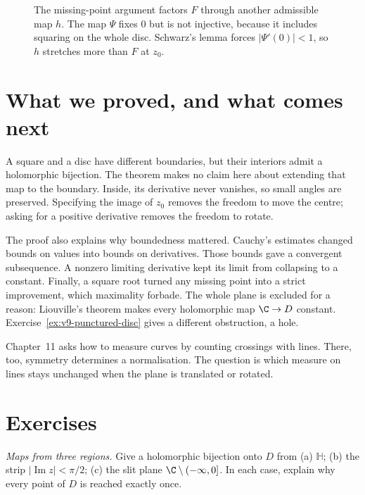 \begin{figure}[ht]
\centering
{}
\caption{The missing-point argument factors $F$ through another admissible map $h$. The map $\Psi$ fixes $0$ but is not injective, because it includes squaring on the whole disc. Schwarz's lemma forces $|\Psi'(0)|<1$, so $h$ stretches more than $F$ at $z_0$.}
\label{fig:v9-extremal-map}
\end{figure}

\section{What we proved, and what comes next}

A square and a disc have different boundaries, but their interiors admit a
holomorphic bijection. The theorem makes no claim here about extending that
map to the boundary. Inside, its derivative never vanishes, so small angles
are preserved. Specifying the image of $z_0$ removes the freedom to move the
centre; asking for a positive derivative removes the freedom to rotate.

The proof also explains why boundedness mattered. Cauchy's estimates changed
bounds on values into bounds on derivatives. Those bounds gave a convergent
subsequence. A nonzero limiting derivative kept its limit from collapsing to
a constant. Finally, a square root turned any missing point into a strict
improvement, which maximality forbade. The whole plane is excluded for a
reason: Liouville's theorem makes every holomorphic map $\C\to D$ constant.
Exercise~\ref{ex:v9-punctured-disc} gives a different obstruction, a hole.

Chapter~11 asks how to measure curves by counting crossings with lines.
There, too, symmetry determines a normalisation. The question is which
measure on lines stays unchanged when the plane is translated or rotated.

\section{Exercises}

\begin{exercise}[$\star$]\label{ex:riemannmaps}
\emph{Maps from three regions.} Give a holomorphic bijection onto $D$ from
(a) $\mathbb H$; (b) the strip $|\operatorname{Im}z|<\pi/2$;
(c) the slit plane $\C\setminus(-\infty,0]$.
In each case, explain why every point of $D$ is reached exactly once.
\end{exercise}

